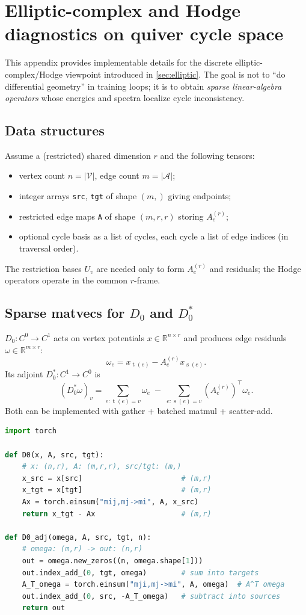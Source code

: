 \documentclass[11pt]{article}
\theoremstyle{definition}
\theoremstyle{plain}
\theoremstyle{remark}
\newcommand{\R}{\mathbb{R}}
\newcommand{\mc}[1]{\mathcal{#1}}
\newcommand{\Nodes}{\mc{V}}
\newcommand{\Edges}{\mc{A}}
\newcommand{\src}{\operatorname{s}}
\newcommand{\tgt}{\operatorname{t}}
\begin{document}
\section{Elliptic-complex and Hodge diagnostics on quiver cycle space}
\label{app:elliptic}

This appendix provides implementable details for the discrete elliptic-complex/Hodge viewpoint introduced in \cref{sec:elliptic}.
The goal is not to ``do differential geometry'' in training loops; it is to obtain \emph{sparse linear-algebra operators} whose energies and spectra localize cycle inconsistency.

\subsection{Data structures}
Assume a (restricted) shared dimension $r$ and the following tensors:
\begin{itemize}[leftmargin=2em]
\item vertex count $n=|\Nodes|$, edge count $m=|\Edges|$;
\item integer arrays \texttt{src}, \texttt{tgt} of shape $(m,)$ giving endpoints;
\item restricted edge maps \texttt{A} of shape $(m,r,r)$ storing $A_e^{(r)}$;
\item optional cycle basis as a list of cycles, each cycle a list of edge indices (in traversal order).
\end{itemize}
The restriction bases $U_v$ are needed only to form $A_e^{(r)}$ and residuals; the Hodge operators operate in the common $r$-frame.

\subsection{Sparse matvecs for $D_0$ and $D_0^\ast$}
$D_0:C^0\to C^1$ acts on vertex potentials $x\in\R^{n\times r}$ and produces edge residuals $\omega\in\R^{m\times r}$:
\[
\omega_e = x_{\tgt(e)} - A_e^{(r)} x_{\src(e)}.
\]
Its adjoint $D_0^\ast:C^1\to C^0$ is
\[
(D_0^\ast \omega)_v
=
\sum_{e:\tgt(e)=v}\omega_e
\;-\;
\sum_{e:\src(e)=v} (A_e^{(r)})^\top \omega_e.
\]
Both can be implemented with gather + batched matmul + scatter-add.

\begin{lstlisting}[language=Python,caption={PyTorch matvecs for $D_0$ and $D_0^\ast$ (shared dimension $r$)},label={lst:d0}]
import torch

def D0(x, A, src, tgt):
    # x: (n,r), A: (m,r,r), src/tgt: (m,)
    x_src = x[src]                       # (m,r)
    x_tgt = x[tgt]                       # (m,r)
    Ax = torch.einsum("mij,mj->mi", A, x_src)
    return x_tgt - Ax                    # (m,r)

def D0_adj(omega, A, src, tgt, n):
    # omega: (m,r) -> out: (n,r)
    out = omega.new_zeros((n, omega.shape[1]))
    out.index_add_(0, tgt, omega)        # sum into targets
    A_T_omega = torch.einsum("mji,mj->mi", A, omega)  # A^T omega
    out.index_add_(0, src, -A_T_omega)   # subtract into sources
    return out
\end{lstlisting}
\end{document}
